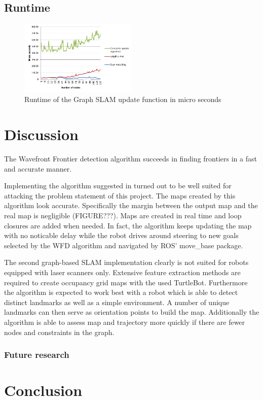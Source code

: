\documentclass{ba-kecs}
\begin{document}
\subsection{Runtime}
\begin{figure}[htbp]
	\centering
		\includegraphics[width=0.50\textwidth]{figures/Runtime.png}
	\caption{Runtime of the Graph SLAM update function in micro seconds}
	\label{fig:runtime}
\end{figure}

\section{Discussion}
\label{sec:disc}
The Wavefront Frontier detection algorithm \citep{Keidar} succeeds in finding frontiers in a fast and accurate manner.

Implementing the algorithm suggested in \citep{Grisetti} turned out to be well suited for attacking the problem statement of this project. The maps created by this algorithm look accurate. Specifically the margin between the output map and the real map is negligible (FIGURE???). Maps are created in real time and loop closures are added when needed. In fact, the algorithm keeps updating the map with no noticable delay while the robot drives around steering to new goals selected by the WFD algorithm and navigated by ROS' move\_base package.

The second graph-based SLAM implementation \cite{Thrun} clearly is not suited for robots equipped with laser scanners only. Extensive feature extraction methods are required to create occupancy grid maps with the used TurtleBot. Furthermore the algorithm is expected to work best with a robot which is able to detect distinct landmarks as well as a simple environment. A number of unique landmarks can then serve as orientation points to build the map. Additionally the algorithm is able to assess map and trajectory more quickly if there are fewer nodes and constraints in the graph.

\subsubsection{Future research}

\section{Conclusion}
\label{sec:conc}

\nocite{*}
\onecolumn
\appendix
\end{document}
